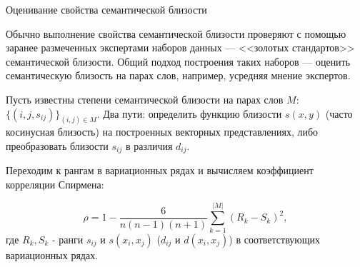 \documentclass[9pt]{beamer}
\begin{document}
\begin{frame}{Оценивание свойства семантической близости}

Обычно выполнение свойства семантической близости проверяют с помощью заранее размеченных экспертами наборов данных --- <<золотых стандартов>> семантической близости. Общий подход построения таких наборов --- оценить семантическую близость на парах слов, например, усредняя мнение экспертов. 
\vspace{\baselineskip}

Пусть известны степени семантической близости на парах слов $M$: $\{(i, j, s_{ij})\}_{(i, j) \in M}$. 
Два пути: определить функцию близости $s(x, y)$ (часто косинусная близость) на построенных векторных представлениях, либо преобразовать близости $s_{ij}$ в различия $d_{ij}$.
\vspace{\baselineskip}

Переходим к рангам в вариационных рядах и вычисляем коэффициент корреляции Спирмена:

\begin{equation}
    \label{spearman}
    \rho = 1 - \dfrac{6}{n(n-1)(n+1)} \sum_{k = 1}^{|M|} (R_k - S_k)^2,
\end{equation}
где $R_k, S_k$ - ранги $s_{ij}$ и $s(x_i, x_j)$ ($d_{ij}$ и $d(x_i, x_j)$) в соответствующих вариационных рядах.
    
\end{frame}
\end{document}
